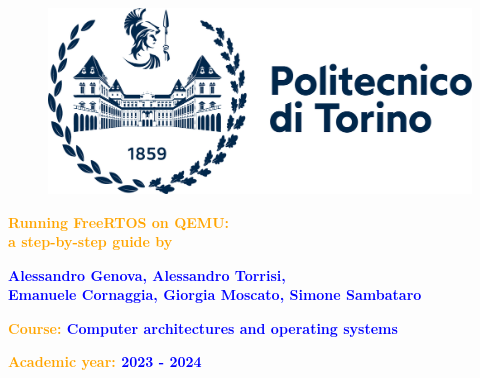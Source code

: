 \begin{titlepage}
    \begin{center}
        \begin{figure}
            \centering
            \includegraphics[scale=0.4]{Images/polito.png}
        \end{figure}
        \vspace*{3cm}

        {
            \fontsize{36}{15}\selectfont
            \textbf{\textcolor{orange}{Running FreeRTOS on QEMU: \\ a step-by-step guide by}}
        }
    \end{center}

    \begin{center}
        \vspace*{0.2cm}

        {
            \fontsize{18}{10}\selectfont
            \textbf{\textcolor{blue}{Alessandro Genova, Alessandro Torrisi,\\ Emanuele Cornaggia, Giorgia Moscato, Simone Sambataro}}
        }

        \vspace*{0.4cm}
    \end{center}

    \vspace*{\fill}
    \begin{FlushLeft}

    \fontsize{18}{10}\selectfont
        {
            \textbf{\textcolor{orange}{Course:}
            \textcolor{blue}{Computer architectures and operating systems}}
        }

        \vspace*{0.4cm}
        {
           \textbf{\textcolor{orange}{Academic year:}
            \textcolor{blue}{2023 - 2024}}
        }

        \vspace{0.3cm}
    \end{FlushLeft}
\end{titlepage}
